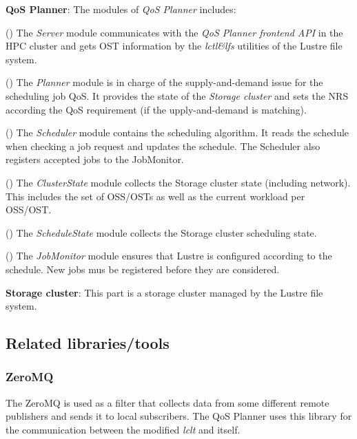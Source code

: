 \documentclass[10pt]{article}
\begin{document}
\textbf{QoS Planner}: The modules of \emph{QoS Planner} includes:

(\textbf{{}}) The \emph{Server} module communicates with the \emph{QoS Planner frontend API} in the HPC cluster and gets OST information by the \emph{lctl\&lfs} utilities of the Lustre file system.

(\textbf{{}})  The \emph{Planner} module is in charge of the supply-and-demand issue for the scheduling job QoS. It provides the state of the \emph{Storage cluster} and sets the NRS according the QoS requirement (if the upply-and-demand is matching).

(\textbf{{}}) The \emph{Scheduler} module contains the scheduling algorithm. It reads the schedule when checking a job request and updates the schedule. The Scheduler also registers accepted jobs to the JobMonitor.

(\textbf{{}}) The \emph{ClusterState} module collects the Storage cluster state (including network). This includes the set of OSS/OSTs as well as the current workload per OSS/OST.

(\textbf{{}}) The \emph{ScheduleState} module collects the Storage cluster scheduling state.

(\textbf{{}}) The \emph{JobMonitor} module ensures that Lustre is configured according to the schedule. New jobs mus be registered before they are considered.

\textbf{Storage cluster}: This part is a storage cluster managed by the Lustre file system.

%
\subsection{Related libraries/tools}
%
\subsubsection{ZeroMQ}
%
The ZeroMQ is used as a filter that collects data from some different remote publishers and sends it to local subscribers. The QoS Planner uses this library for the communication between the modified \emph{lclt} and itself.
\end{document}
